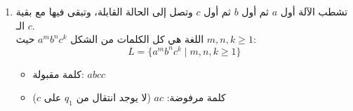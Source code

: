 \documentclass[14pt]{extarticle}
\begin{document}
\begin{enumerate}[itemsep=4em]
\begin{enumerate}[itemsep=2em]
\ifwithsols
\begin{boxSolution}
تبحث الآلة عن أول $a$ تشطبها، ثم تمر على بقية الـ $a$، ثم تبحث عن أول $b$ تشطبها وتصل إلى الحالة القابلة.\\
\textbf{ملاحظة:} الحالة $q_2$ قابلة وفيها حلقة على $b$، لذلك يمكن أن تبقى فيها.\\
اللغة هي كل الكلمات من الشكل $a^m b^n$ حيث $m, n \geq 1$:
\[ L = \{ a^m b^n \mid m, n \geq 1 \} \]
\begin{itemize}
    \item كلمة مقبولة: $aabb$
    \item كلمة مرفوضة: $ba$ (تتوقف في $q_0$ لأنه لا يوجد انتقال على $b$)
\end{itemize}
\end{boxSolution}
\fi

\item
\begin{center}
\end{center}

\ifwithsols
\begin{boxSolution}
تشطب الآلة أول $a$ ثم أول $b$ ثم أول $c$ وتصل إلى الحالة القابلة، وتبقى فيها مع بقية الـ $c$.\\
اللغة هي كل الكلمات من الشكل $a^m b^n c^k$ حيث $m, n, k \geq 1$:
\[ L = \{ a^m b^n c^k \mid m, n, k \geq 1 \} \]
\begin{itemize}
    \item كلمة مقبولة: $abcc$
    \item كلمة مرفوضة: $ac$ (لا يوجد انتقال من $q_1$ على $c$)
\end{itemize}
\end{boxSolution}
\clearpage
\fi

\end{enumerate}

\clearpage

\end{enumerate}
\end{document}
